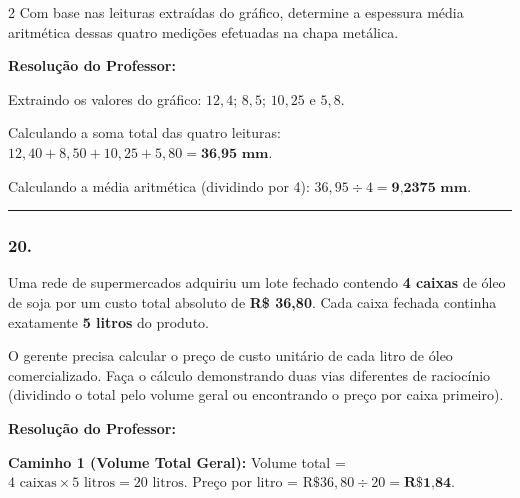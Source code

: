 \begin{multicols*}{2}
Com base nas leituras extraídas do gráfico, determine a espessura média aritmética dessas quatro medições efetuadas na chapa metálica.

\ifgabarito
    \begin{tcolorbox}[colback=CorTitUm!5, colframe=CorTitUm, boxrule=1pt, arc=4pt, left=6pt, right=6pt, top=6pt, bottom=6pt]
    \small\textbf{\textcolor{CorTitUm}{Resolução do Professor:}}\par\vspace{0.1cm}
    \color{CinzaEscuro}
    Extraindo os valores do gráfico: $12,4$; $8,5$; $10,25$ e $5,8$.
    
    Calculando a soma total das quatro leituras:
    $12,40 + 8,50 + 10,25 + 5,80 = \textbf{36,95 mm}$.
    
    Calculando a média aritmética (dividindo por 4):
    $36,95 \div 4 = \textbf{9,2375 mm}$.
    \end{tcolorbox}
\fi

\par\vspace{\espacoQuestao}

\noindent\textcolor{CorLinha}{\rule{\linewidth}{0.5pt}} 
\par\vspace{\espacoPreQuestao}
\subsubsection*{20.} Uma rede de supermercados adquiriu um lote fechado contendo \textbf{4 caixas} de óleo de soja por um custo total absoluto de \textbf{R\$ 36,80}. Cada caixa fechada continha exatamente \textbf{5 litros} do produto.

O gerente precisa calcular o preço de custo unitário de cada litro de óleo comercializado. Faça o cálculo demonstrando duas vias diferentes de raciocínio (dividindo o total pelo volume geral ou encontrando o preço por caixa primeiro).

\ifgabarito
    \begin{tcolorbox}[colback=CorTitUm!5, colframe=CorTitUm, boxrule=1pt, arc=4pt, left=6pt, right=6pt, top=6pt, bottom=6pt]
    \small\textbf{\textcolor{CorTitUm}{Resolução do Professor:}}\par\vspace{0.1cm}
    \color{CinzaEscuro}
    \textbf{Caminho 1 (Volume Total Geral):}
    Volume total = $4 \text{ caixas} \times 5 \text{ litros} = 20 \text{ litros}$.
    Preço por litro = $\text{R\$} 36,80 \div 20 = \textbf{R\$ 1,84}$.
    

\end{tcolorbox}
\end{multicols*}

